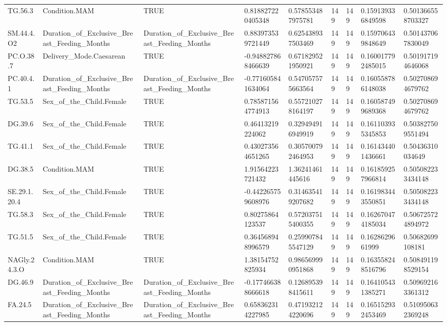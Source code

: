 \begin{longtable}{lllllllll}
TG.56.3 & Condition.MAM & TRUE & 0.818827220405348 & 0.578553487975781 & 149 & 149 & 0.159139336849598 & 0.501366558703327 \\
SM.44.4.O2 & Duration\_of\_Exclusive\_Breast\_Feeding\_Months & Duration\_of\_Exclusive\_Breast\_Feeding\_Months & 0.883973539721449 & 0.625438937503469 & 149 & 149 & 0.159706439848649 & 0.501437067830049 \\
PC.O.38.7 & Delivery\_Mode.Caesarean & TRUE & -0.948827868466639 & 0.671829521950921 & 149 & 149 & 0.160017792485015 & 0.501917194646068 \\
PC.40.4.1 & Duration\_of\_Exclusive\_Breast\_Feeding\_Months & Duration\_of\_Exclusive\_Breast\_Feeding\_Months & -0.771605841634064 & 0.547057575663564 & 149 & 149 & 0.160558786148038 & 0.502708694679762 \\
TG.53.5 & Sex\_of\_the\_Child.Female & TRUE & 0.785871564774913 & 0.557210278164197 & 149 & 149 & 0.160587499689368 & 0.502708694679762 \\
DG.39.6 & Sex\_of\_the\_Child.Female & TRUE & 0.46413219224062 & 0.329494916949919 & 149 & 149 & 0.161103935345853 & 0.503827509551494 \\
TG.41.1 & Sex\_of\_the\_Child.Female & TRUE & 0.430273564651265 & 0.305700792464953 & 149 & 149 & 0.161434401436661 & 0.50436310034649 \\
DG.38.5 & Condition.MAM & TRUE & 1.91564223721432 & 1.36241461445616 & 149 & 149 & 0.161859257966814 & 0.505082233434148 \\
SE.29.1.20.4 & Sex\_of\_the\_Child.Female & TRUE & -0.442265759608976 & 0.314635419207682 & 149 & 149 & 0.161983443550851 & 0.505082233434148 \\
TG.58.3 & Sex\_of\_the\_Child.Female & TRUE & 0.80275864123537 & 0.572037515400355 & 149 & 149 & 0.162670474185034 & 0.506725724894972 \\
TG.51.5 & Sex\_of\_the\_Child.Female & TRUE & 0.364568948996579 & 0.259907845547129 & 149 & 149 & 0.1628629661999 & 0.50682699108181 \\
NAGly.24.3.O & Condition.MAM & TRUE & 1.38154752825934 & 0.986569990951868 & 149 & 149 & 0.163558248516796 & 0.508491198529154 \\
DG.46.9 & Duration\_of\_Exclusive\_Breast\_Feeding\_Months & Duration\_of\_Exclusive\_Breast\_Feeding\_Months & -0.177466388666618 & 0.126895398415611 & 149 & 149 & 0.164105431385271 & 0.509692163361312 \\
FA.24.5 & Duration\_of\_Exclusive\_Breast\_Feeding\_Months & Duration\_of\_Exclusive\_Breast\_Feeding\_Months & 0.658362314227985 & 0.471932124220696 & 149 & 149 & 0.165152932453469 & 0.510950632369248 \\

\end{longtable}
